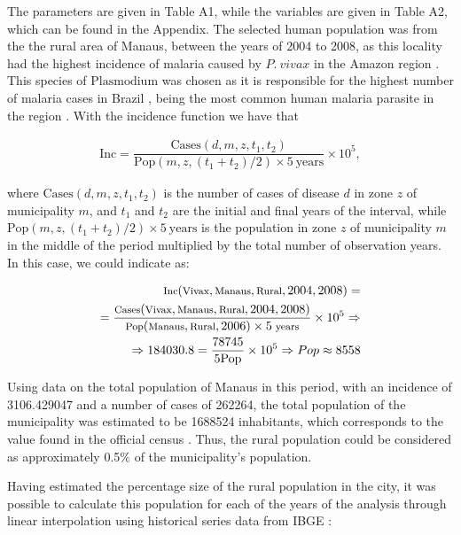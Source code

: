 \documentclass[a4paper,fleqn]{cas-dc}
\begin{document}
The parameters are given in Table A1, while the variables are given in Table A2, which can be found in the Appendix. 
The selected human population was from the the rural area of Manaus, between the years of 2004 to 2008, as this locality had the highest incidence of malaria 
caused by $P. \ vivax$ in the Amazon region \cite{Rorato2023}. This species of $\text{Plasmodium}$ was chosen as it is responsible for the highest number of malaria
 cases in Brazil \cite{OliveiraFerreira2010, 10.3389/fpubh.2021.647754}, being the most common human malaria 
parasite in the region \cite{Vector_Incrimination}. With the incidence function \cite{Rorato2023} we have that

\begin{align}
\text{Inc} = %
\dfrac{\text{Cases}(d, m, z, t_1, t_2)}{\text{Pop}(m,z,(t_1+t_2)/2) \times 5 \ \text{years}} \times 10^5,
\end{align}

where $\text{Cases}(d, m, z, t_1, t_2)$ is the number of cases of disease $d$ in zone $z$ of municipality 
$m$, and $t_1$ and $t_2$ are the initial and final years of the interval, while 
$\text{Pop}(m,z,(t_1+t_2)/2) \times 5 \ \text{years}$ is the population in zone $z$ 
of municipality $m$ in the middle of the period multiplied by the total number 
of observation years. In this case, we could indicate as:

\begin{align}
    \footnotesize{\text{Inc}(\text{Vivax}, \text{Manaus}, \text{Rural}, 2004, 2008) = } \\
= \footnotesize{\dfrac{\text{Cases}(\text{Vivax}, \text{Manaus}, \text{Rural}, 2004, 2008)}{\text{Pop}(\text{Manaus}, \text{Rural}, 2006) \times 5 \ \text{years}} \times 10^5} \Rightarrow  \\
    \Rightarrow 184030.8 = \dfrac{78745}{5\text{Pop}} \times 10^5 \Rightarrow Pop \approx 8558
\end{align}

Using data on the total population of Manaus in this period, 
with an incidence of 3106.429047 and a number of cases of 262264, the 
total population of the municipality was estimated to be 1688524 
inhabitants, which corresponds to the value found in the official census \cite{Datasus2006}. Thus, the rural population could be considered as 
approximately 0.5$\%$ of the municipality's population.

Having estimated the percentage size of the rural population 
in the city, it was possible to calculate this population for 
each of the years of the analysis through linear interpolation 
using historical series data from IBGE \cite{popIBGE}:
\end{document}
